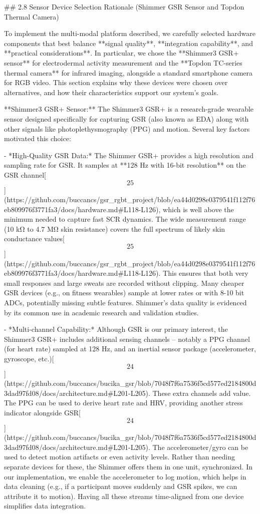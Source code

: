 \documentclass[12pt,a4paper]{article}
\begin{document}
## 2.8 Sensor Device Selection Rationale (Shimmer GSR Sensor and Topdon Thermal Camera)

To implement the multi-modal platform described, we carefully selected
hardware components that best balance **signal quality**, **integration
capability**, and **practical considerations**. In particular, we chose
the **Shimmer3 GSR+ sensor** for electrodermal activity measurement and
the **Topdon TC-series thermal camera** for infrared imaging, alongside
a standard smartphone camera for RGB video. This section explains why
these devices were chosen over alternatives, and how their
characteristics support our system's goals.

**Shimmer3 GSR+ Sensor:** The Shimmer3 GSR+ is a research-grade wearable
sensor designed specifically for capturing GSR (also known as EDA) along
with other signals like photoplethysmography (PPG) and motion. Several
key factors motivated this choice:

- *High-Quality GSR Data:* The Shimmer GSR+ provides a high resolution
  and sampling rate for GSR. It samples at **128 Hz with 16-bit
  resolution** on the GSR
  channel[\[25\]](https://github.com/buccancs/gsr_rgbt_project/blob/ea44d0298e0379541f112f76eb809976f3771fa3/docs/hardware.md#L118-L126),
  which is well above the minimum needed to capture fast SCR dynamics.
  The wide measurement range (10 kΩ to 4.7 MΩ skin resistance) covers
  the full spectrum of likely skin conductance
  values[\[25\]](https://github.com/buccancs/gsr_rgbt_project/blob/ea44d0298e0379541f112f76eb809976f3771fa3/docs/hardware.md#L118-L126).
  This ensures that both very small responses and large sweats are
  recorded without clipping. Many cheaper GSR devices (e.g., on fitness
  wearables) sample at lower rates or with 8-10 bit ADCs, potentially
  missing subtle features. Shimmer's data quality is evidenced by its
  common use in academic research and validation studies.

- *Multi-channel Capability:* Although GSR is our primary interest, the
  Shimmer3 GSR+ includes additional sensing channels -- notably a PPG
  channel (for heart rate) sampled at 128 Hz, and an inertial sensor
  package (accelerometer, gyroscope,
  etc.)[\[24\]](https://github.com/buccancs/bucika_gsr/blob/7048f7f6a7536f5cd577ed2184800d3dad97fd08/docs/architecture.md#L201-L205).
  These extra channels add value. The PPG can be used to derive heart
  rate and HRV, providing another stress indicator alongside
  GSR[\[24\]](https://github.com/buccancs/bucika_gsr/blob/7048f7f6a7536f5cd577ed2184800d3dad97fd08/docs/architecture.md#L201-L205).
  The accelerometer/gyro can be used to detect motion artifacts or even
  activity levels. Rather than needing separate devices for these, the
  Shimmer offers them in one unit, synchronized. In our implementation,
  we enable the accelerometer to log motion, which helps in data
  cleaning (e.g., if a participant moves suddenly and GSR spikes, we can
  attribute it to motion). Having all these streams time-aligned from
  one device simplifies data integration.
\end{document}
